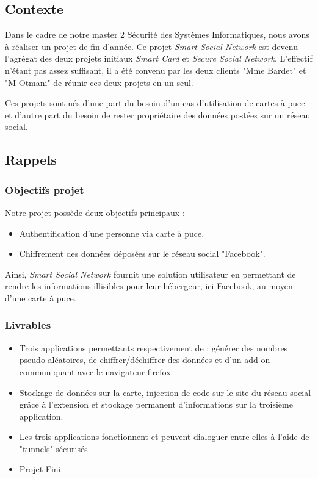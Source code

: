\documentclass[a4paper,11pt,french]{article}
\begin{document}
\subsection{Contexte}
	Dans le cadre de notre master 2 Sécurité des Systèmes Informatiques,
nous avons à réaliser un projet de fin d'année. Ce projet \emph{Smart Social
Network} est devenu l'agrégat des deux projets initiaux \emph{Smart Card} et
\emph{Secure Social Network}. L'effectif n'étant pas assez suffisant, il a
été convenu par les deux clients "Mme Bardet" et "M Otmani" de réunir ces
deux projets en un seul.


	Ces projets sont nés d'une part du besoin d'un cas d'utilisation de
cartes à puce et d'autre part du besoin de rester propriétaire des données
postées sur un réseau social.


\subsection{Rappels}
\subsubsection{Objectifs projet}
	Notre projet possède deux objectifs principaux :
\begin{itemize}
	\item Authentification d'une personne via carte à puce.
	\item Chiffrement des données déposées sur le réseau social
"Facebook".
\end{itemize}

	Ainsi, \emph{Smart Social Network} fournit une solution utilisateur
en permettant de rendre les informations illisibles pour leur hébergeur, ici
Facebook, au moyen d'une carte à puce.

\subsubsection{Livrables}
\begin{itemize}
	\item Trois applications permettants respectivement de : générer des
nombres pseudo-aléatoires, de chiffrer/déchiffrer des données et d'un add-on
communiquant avec le navigateur firefox.
	\item Stockage de données sur la carte, injection de code sur le site
du réseau social grâce à l'extension et stockage permanent d'informations sur
la troisième application.
	\item Les trois applications fonctionnent et peuvent dialoguer entre
elles à l'aide de "tunnels" sécurisés
	\item Projet Fini.
\end{itemize}
\end{document}
